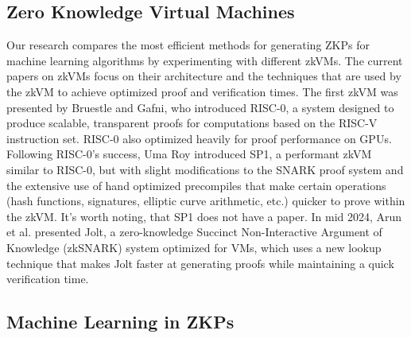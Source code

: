 \documentclass{scrartcl}
\begin{document}

\subsection{Zero Knowledge Virtual Machines}

Our research compares the most efficient methods for generating ZKPs for machine learning algorithms by experimenting with different zkVMs. The current papers on zkVMs focus on their architecture and the techniques that are used by the zkVM to achieve optimized proof and verification times. The first zkVM was presented by Bruestle and Gafni\cite{bruestle2023risc}, who introduced RISC-0, a system designed to produce scalable, transparent proofs for computations based on the RISC-V instruction set. RISC-0 also optimized heavily for proof performance on GPUs. Following RISC-0's success, Uma Roy\cite{Roy2024} introduced SP1, a performant zkVM similar to RISC-0, but with slight modifications to the SNARK proof system and the extensive use of hand optimized precompiles that make certain operations (hash functions, signatures, elliptic curve arithmetic, etc.) quicker to prove within the zkVM. It's worth noting, that SP1 does not have a paper. In mid 2024, Arun et al.\cite{arun2024jolt} presented Jolt, a zero-knowledge Succinct Non-Interactive Argument of Knowledge (zkSNARK) system optimized for VMs, which uses a new lookup technique that makes Jolt faster at generating proofs while maintaining a quick verification time.

\subsection{Machine Learning in ZKPs}
\end{document}
